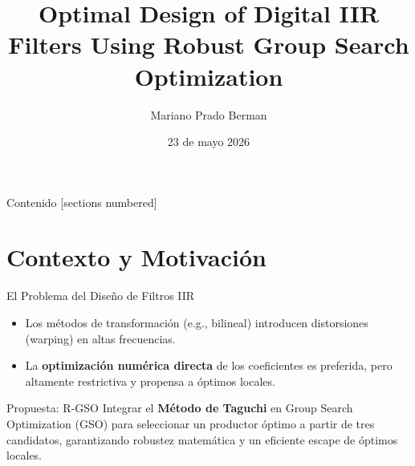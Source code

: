 \documentclass[10pt]{beamer}
\title{Optimal Design of Digital IIR Filters Using Robust Group Search Optimization}
\date{23 de mayo 2026}
\author{Mariano Prado Berman}
\institute{Instituto de Investigación en Comunicación Óptica (IICO)}
\begin{document}
\maketitle

\begin{frame}{Contenido}
  [sections numbered]
  \tableofcontents[hideallsubsections]
\end{frame}

%
%
%
%

\section{Contexto y Motivación}

\begin{frame}{El Problema del Diseño de Filtros IIR}
  \begin{itemize}
    \item Los métodos de transformación (e.g., bilineal) introducen distorsiones (warping) en altas frecuencias.
    \item La \textbf{optimización numérica directa} de los coeficientes es preferida, pero altamente restrictiva y propensa a óptimos locales.
  \end{itemize}
  \begin{alertblock}{Propuesta: R-GSO}
    Integrar el \textbf{Método de Taguchi} en Group Search Optimization (GSO) para seleccionar un productor óptimo a partir de tres candidatos, garantizando robustez matemática y un eficiente escape de óptimos locales.
  \end{alertblock}
\end{frame}
\end{document}
